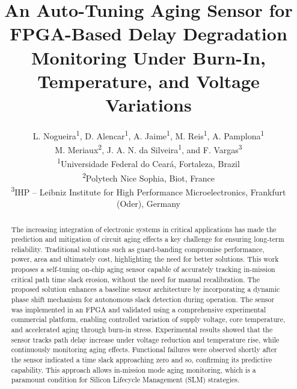 \documentclass[a4paper,10pt,twoside,twocolumn,final]{JICS_LaTexGuidelines}
\begin{document}
\title{An Auto-Tuning Aging Sensor for FPGA-Based Delay Degradation Monitoring Under Burn-In, Temperature, and Voltage Variations}

\author{L. Nogueira\textsuperscript{1}, D. Alencar\textsuperscript{1}, A. Jaime\textsuperscript{1}, M. Reis\textsuperscript{1}, A. Pamplona\textsuperscript{1}\\
M. Meriaux\textsuperscript{2}, J. A. N. da Silveira\textsuperscript{1}, and F. Vargas\textsuperscript{3}\\
\small
\textsuperscript{1}Universidade Federal do Cear\'a, Fortaleza, Brazil\\
\textsuperscript{2}Polytech Nice Sophia, Biot, France\\
\textsuperscript{3}IHP -- Leibniz Institute for High Performance Microelectronics, Frankfurt (Oder), Germany}

%
{}%
\renewcommand*\footnoterule{}%
%
\maketitle

\begin{abstract} The increasing integration of electronic systems in critical applications has made the prediction and mitigation of circuit aging effects a key challenge for ensuring long-term reliability. Traditional solutions such as guard-banding compromise performance, power, area and ultimately cost, highlighting the need for better solutions. This work proposes a self-tuning on-chip aging sensor capable of accurately tracking in-mission critical path time slack erosion, without the need for manual recalibration. The proposed solution enhances a baseline sensor architecture by incorporating a dynamic phase shift mechanism for autonomous slack detection during operation. The sensor was implemented in an FPGA and validated using a comprehensive experimental commercial platform, enabling controlled variation of supply voltage, core temperature, and accelerated aging through burn-in stress. Experimental results showed that the sensor tracks path delay increase under voltage reduction and temperature rise, while continuously monitoring aging effects. Functional failures were observed shortly after the sensor indicated a time slack approaching zero and so, confirming its predictive capability. This approach allows in-mission mode aging monitoring, which is a paramount condition for Silicon Lifecycle Management (SLM) strategies. \end{abstract}
\end{document}
